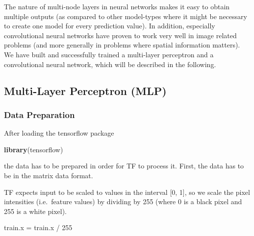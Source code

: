 \documentclass[]{article}
\newenvironment{Shaded}{\begin{snugshade}}{\end{snugshade}}
\newcommand{\KeywordTok}[1]{\textcolor[rgb]{0.13,0.29,0.53}{\textbf{{#1}}}}
\newcommand{\DecValTok}[1]{\textcolor[rgb]{0.00,0.00,0.81}{{#1}}}
\newcommand{\StringTok}[1]{\textcolor[rgb]{0.31,0.60,0.02}{{#1}}}
\newcommand{\NormalTok}[1]{{#1}}
\begin{document}
The nature of multi-node layers in neural networks makes it easy to
obtain multiple outputs (as compared to other model-types where it might
be necessary to create one model for every prediction value). In
addition, especially convolutional neural networks have proven to work
very well in image related problems (and more generally in problems
where spatial information matters). We have built and successfully
trained a multi-layer perceptron and a convolutional neural network,
which will be described in the following.

\subsection{Multi-Layer Perceptron
(MLP)}\label{multi-layer-perceptron-mlp}

\subsubsection{Data Preparation}\label{data-preparation}

After loading the tensorflow package

\begin{Shaded}
\begin{Highlighting}[]
\KeywordTok{library}\NormalTok{(tensorflow)}
\end{Highlighting}
\end{Shaded}

the data has to be prepared in order for TF to process it. First, the
data has to be in the matrix data format.

\begin{Shaded}
\end{Shaded}

TF expects input to be scaled to values in the interval {[}0, 1{]}, so
we scale the pixel intensities (i.e.~feature values) by dividing by 255
(where 0 is a black pixel and 255 is a white pixel).

\begin{Shaded}
\begin{Highlighting}[]
\NormalTok{train.x =}\StringTok{ }\NormalTok{train.x /}\StringTok{ }\DecValTok{255}
\end{Highlighting}
\end{Shaded}
\end{document}
